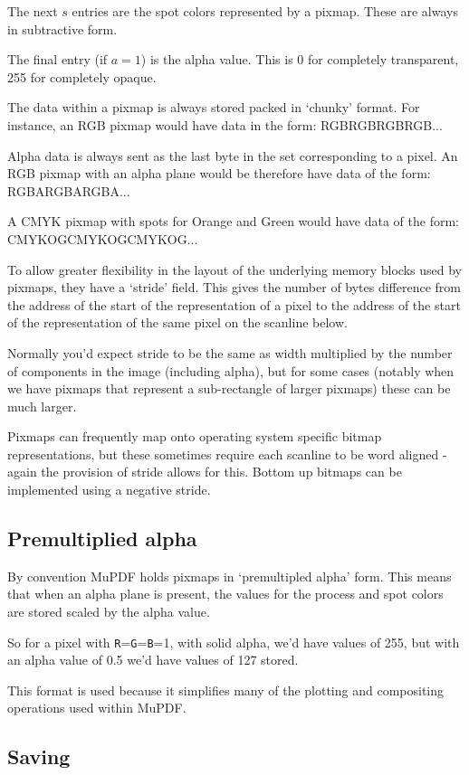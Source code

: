 \documentclass[oneside]{book}
\begin{document}
The next $s$ entries are the spot colors represented by a pixmap. These are always in subtractive form.

The final entry (if $a = 1$) is the alpha value. This is 0 for completely transparent, 255 for completely opaque.

The data within a pixmap is always stored packed in `chunky' format. For instance, an RGB pixmap would have data in the form: RGBRGBRGBRGB... 

Alpha data is always sent as the last byte in the set corresponding to a pixel. An RGB pixmap with an alpha plane would be therefore have data of the form: RGBARGBARGBA...

A CMYK pixmap with spots for Orange and Green would have data of the form: CMYKOGCMYKOGCMYKOG...

To allow greater flexibility in the layout of the underlying memory blocks used by pixmaps, they have a `stride' field. This gives the number of bytes difference from the address of the start of the representation of a pixel to the address of the start of the representation of the same pixel on the scanline below.

Normally you'd expect stride to be the same as width multiplied by the number of components in the image (including alpha), but for some cases (notably when we have pixmaps that represent a sub-rectangle of larger pixmaps) these can be much larger.

Pixmaps can frequently map onto operating system specific bitmap representations, but these sometimes require each scanline to be word aligned - again the provision of stride allows for this. Bottom up bitmaps can be implemented using a negative stride.

\subsection{Premultiplied alpha}

By convention MuPDF holds pixmaps in `premultipled alpha' form. This means that when an alpha plane is present, the values for the process and spot colors are stored scaled by the alpha value.

So for a pixel with \texttt{R}=\texttt{G}=\texttt{B}=1, with solid alpha, we'd have values of 255, but with an alpha value of 0.5 we'd have values of 127 stored.

This format is used because it simplifies many of the plotting and compositing operations used within MuPDF.

\subsection{Saving}
\end{document}
